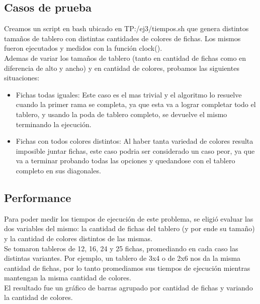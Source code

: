 \newpage

\subsection{Casos de prueba}

Creamos un script en bash ubicado en TP:/ej3/tiempos.sh que genera distintos tama\~nos de tablero con distintas cantidades de colores de fichas. Los mismos fueron ejecutados y medidos con la funci\'on clock(). \\

Ademas de variar los tama\~nos de tablero (tanto en cantidad de fichas como en diferencia de alto y ancho) y en cantidad de colores, probamos las siguientes situaciones:\\

\begin{itemize}
\item Fichas todas iguales: Este caso es el mas trivial y el algoritmo lo resuelve cuando la primer rama se completa, ya que esta va a lograr completar todo el tablero, y usando la poda de tablero completo, se devuelve el mismo terminando la ejecuci\'on.
\item Fichas con todos colores distintos: Al haber tanta variedad de colores resulta imposible juntar fichas, este caso podria ser considerado un caso peor, ya que va a terminar probando todas las opciones y quedandose con el tablero completo en sus diagonales.
\end{itemize}

\subsection{Performance}

Para poder medir los tiempos de ejecuci\'on de este problema, se eligi\'o evaluar las dos variables del mismo: la cantidad de fichas del tablero (y por ende su tama\~no) y la cantidad de colores distintos de las mismas. \\

Se tomaron tableros de 12, 16, 24 y 25 fichas, promediando en cada caso las distintas variantes. Por ejemplo, un tablero de 3x4 o de 2x6 nos da la misma cantidad de fichas, por lo tanto promediamos sus tiempos de ejecuci\'on mientras mantengan la misma cantidad de colores. \\

El resultado fue un gr\'afico de barras agrupado por cantidad de fichas y variando la cantidad de colores.

